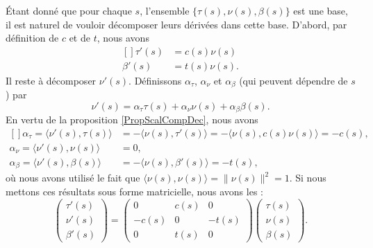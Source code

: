 Étant donné que pour chaque $s$, l'ensemble $\{ \tau(s),\nu(s),\beta(s) \}$ est une base, il est naturel de vouloir décomposer leurs dérivées dans cette base. D'abord, par définition de $c$ et de $t$, nous avons
\begin{equation}
    \begin{aligned}[]
        \tau'(s)&=c(s)\nu(s)\\
        \beta'(s)&=t(s)\nu(s).
    \end{aligned}
\end{equation}
Il reste à décomposer $\nu'(s)$. Définissons $\alpha_{\tau}$, $\alpha_{\nu}$ et $\alpha_{\beta}$ (qui peuvent dépendre de $s$) par
\begin{equation}
    \nu'(s)=\alpha_{\tau}\tau(s)+\alpha_{\nu}\nu(s)+\alpha_{\beta}\beta(s).
\end{equation}
En vertu de la proposition \ref{PropScalCompDec}, nous avons
\begin{equation}
    \begin{aligned}[]
        \alpha_{\tau}=\langle \nu'(s), \tau(s)\rangle&=-\langle \nu(s), \tau'(s)\rangle =-\langle \nu(s), c(s)\nu(s)\rangle =-c(s) ,\\
        \alpha_{\nu}=\langle \nu'(s),  \nu(s)\rangle &=0,\\
        \alpha_{\beta}=\langle \nu'(s), \beta(s)\rangle &=-\langle \nu(s), \beta'(s)\rangle =-t(s),
    \end{aligned}
\end{equation}
où nous avons utilisé le fait que $\langle \nu(s), \nu(s)\rangle =\| \nu(s) \|^2=1$. Si nous mettons ces résultats sous forme matricielle, nous avons les  :
\begin{equation}
    \begin{pmatrix}
        \tau'(s)    \\ 
        \nu'(s) \\ 
        \beta'(s)   
    \end{pmatrix}=
    \begin{pmatrix}
        0   &   c(s)    &   0   \\
        -c(s)   &   0   &   -t(s)   \\
        0   &   t(s)    &   0
    \end{pmatrix}
    \begin{pmatrix}
        \tau(s) \\ 
        \nu(s)  \\ 
        \beta(s)    
    \end{pmatrix}.
\end{equation}


